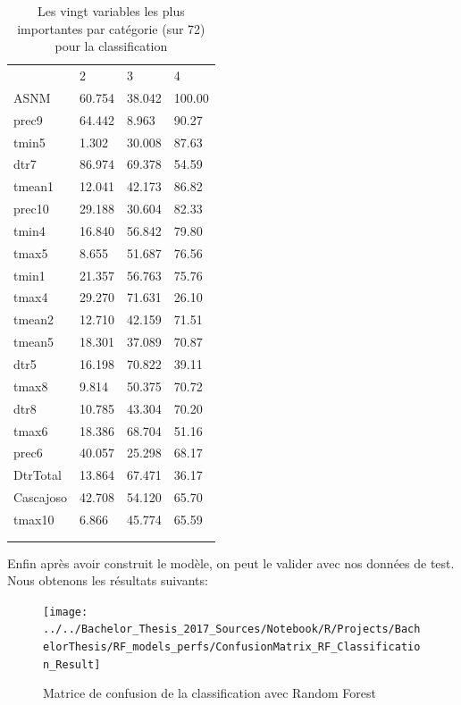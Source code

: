 \begin{table}[H]
	\centering
	\caption{Les vingt variables les plus importantes par catégorie (sur 72) pour la classification}
	\label{RF_Class_Impvar}
	\begin{tabular}{llll}
		& 2      & 3      & 4      \\
		ASNM      & 60.754 & 38.042 & 100.00 \\
		prec9     & 64.442 & 8.963  & 90.27  \\
		tmin5     & 1.302  & 30.008 & 87.63  \\
		dtr7      & 86.974 & 69.378 & 54.59  \\
		tmean1    & 12.041 & 42.173 & 86.82  \\
		prec10    & 29.188 & 30.604 & 82.33  \\
		tmin4     & 16.840 & 56.842 & 79.80  \\
		tmax5     & 8.655  & 51.687 & 76.56  \\
		tmin1     & 21.357 & 56.763 & 75.76  \\
		tmax4     & 29.270 & 71.631 & 26.10  \\
		tmean2    & 12.710 & 42.159 & 71.51  \\
		tmean5    & 18.301 & 37.089 & 70.87  \\
		dtr5      & 16.198 & 70.822 & 39.11  \\
		tmax8     & 9.814  & 50.375 & 70.72  \\
		dtr8      & 10.785 & 43.304 & 70.20  \\
		tmax6     & 18.386 & 68.704 & 51.16  \\
		prec6     & 40.057 & 25.298 & 68.17  \\
		DtrTotal  & 13.864 & 67.471 & 36.17  \\
		Cascajoso & 42.708 & 54.120 & 65.70  \\
		tmax10    & 6.866  & 45.774 & 65.59  \\
		&        &        &        \\
		&        &        &       
	\end{tabular}
\end{table}

\noindent Enfin après avoir construit le modèle, on peut le valider avec nos données de test. Nous obtenons les résultats suivants: 


\begin{figure}[H]
	\centering
	\texttt{[image: ../../Bachelor\_Thesis\_2017\_Sources/Notebook/R/Projects/BachelorThesis/RF\_models\_perfs/ConfusionMatrix\_RF\_Classification\_Result]}
	\caption{Matrice de confusion de la classification avec Random Forest}
	\label{fig:confusionmatrixrfclassificationresult}
\end{figure}

